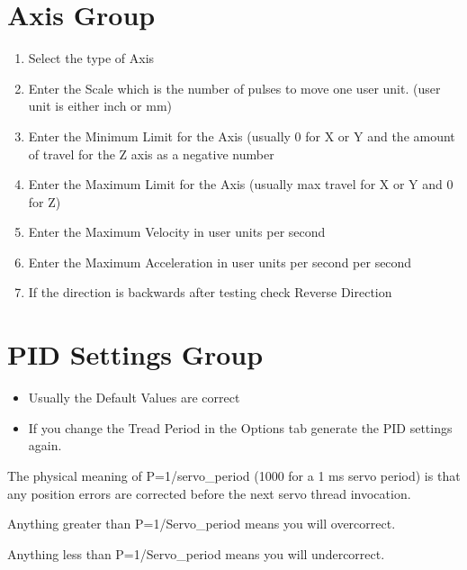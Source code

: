 \documentclass[letterpaper,10pt,english,openany,oneside]{sphinxmanual}
\begin{document}
\section{Axis Group}
\label{\detokenize{axes:axis-group}}\begin{enumerate}
%
\item {} 
Select the type of Axis

\item {} 
Enter the Scale which is the number of pulses to move one user unit.
(user unit is either inch or mm)

\item {} 
Enter the Minimum Limit for the Axis (usually 0 for X or Y and the
amount of travel for the Z axis as a negative number

\item {} 
Enter the Maximum Limit for the Axis (usually max travel for X or Y
and 0 for Z)

\item {} 
Enter the Maximum Velocity in user units per second

\item {} 
Enter the Maximum Acceleration in user units per second per second

\item {} 
If the direction is backwards after testing check Reverse Direction

\end{enumerate}


\section{PID Settings Group}
\label{\detokenize{axes:pid-settings-group}}\begin{itemize}
\item {} 
Usually the Default Values are correct

\item {} 
If you change the Tread Period in the Options tab generate the PID
settings again.

\end{itemize}

The physical meaning of P=1/servo\_period (1000 for a 1 ms servo period)
is that any position errors are corrected before the next servo thread
invocation.

Anything greater than P=1/Servo\_period means you will over\sphinxhyphen{}correct.

Anything less than P=1/Servo\_period means you will under\sphinxhyphen{}correct.
\end{document}

